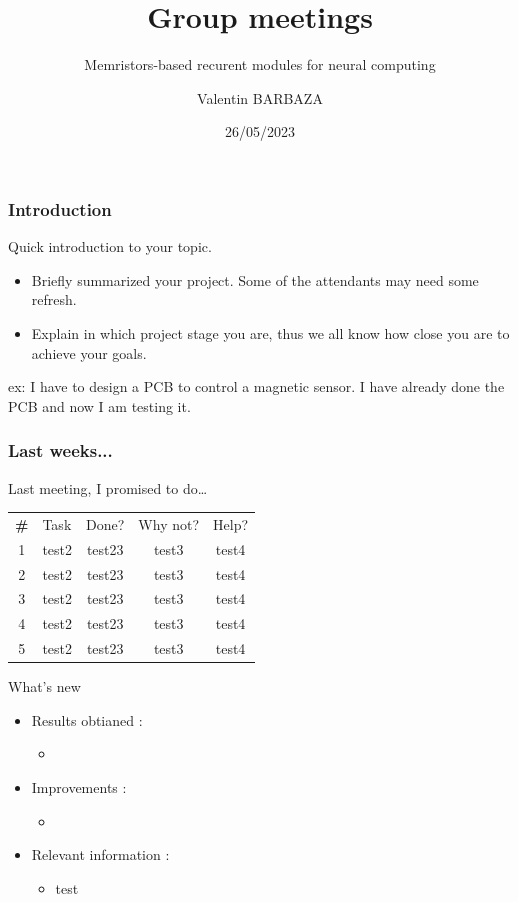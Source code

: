 \documentclass[table]{beamer}
\title{Group meetings}
\subtitle{Memristors-based recurent modules for neural computing}
\author[V. BARBAZA]{Valentin BARBAZA}
\date{26/05/2023}
\begin{document}
  \frame{\titlepage}


  \begin{frame}
    \frametitle{Introduction}
    Quick introduction to your topic.

    \begin{itemize}
        \color{text}
      \item Briefly summarized your project. Some of the attendants may need some refresh.
      \item Explain in which project stage you are, thus we all know how close you are to achieve your goals.
    \end{itemize}

    ex: I have to design a PCB to control a magnetic sensor. I have already done the PCB and now I am testing it.
  \end{frame}


  \begin{frame}
    \frametitle{Last weeks...}

    Last meeting, I promised to do…

    \centering
    \begin{tabular}{ c m{3cm} c c c }
      \rowcolor{firstRow}
      \color{white}\textbf{\#} & \centering\color{white}Task & \color{white}Done? & \color{white}Why not? & \color{white}Help? \\
      1 & test2 & test23 & test3 & test4\\
      2 & test2 & test23 & test3 & test4\\
      3 & test2 & test23 & test3 & test4\\
      4 & test2 & test23 & test3 & test4\\
      5 & test2 & test23 & test3 & test4\\
    \end{tabular}

  \end{frame}

  \begin{frame}{What's new}
    \begin{itemize}
      \item Results obtianed :
        \begin{itemize}
            \color{text}
          \item
        \end{itemize}
      \item Improvements :
        \begin{itemize}
            \color{text}
          \item
        \end{itemize}
      \item Relevant information :
        \begin{itemize}
            \color{text}
          \item test
        \end{itemize}
    \end{itemize}
  \end{frame}
\end{document}
